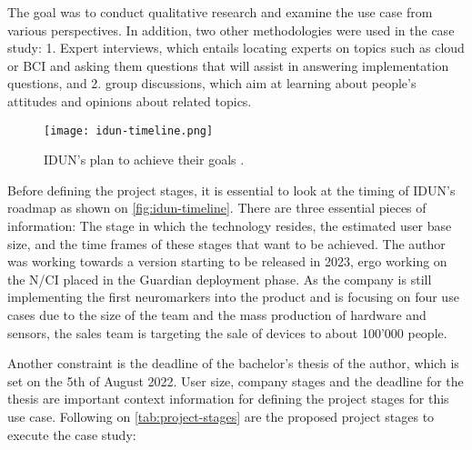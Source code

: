 The goal was to conduct qualitative research and examine the use case from various perspectives. In addition, two other methodologies were used in the case study: 1. Expert interviews, which entails locating experts on topics such as cloud or BCI and asking them questions that will assist in answering implementation questions, and 2. group discussions, which aim at learning about people's attitudes and opinions about related topics.

\begin{figure}[!ht]
  \centering
  \texttt{[image: idun-timeline.png]}
  \caption{IDUN's plan to achieve their goals \citep{idun_guardian_nodate}.}
  \label{fig:idun-timeline}
\end{figure}

Before defining the project stages, it is essential to look at the timing of IDUN's roadmap as shown on \autoref{fig:idun-timeline}. There are three essential pieces of information: The stage in which the technology resides, the estimated user base size, and the time frames of these stages that want to be achieved. The author was working towards a version starting to be released in 2023, ergo working on the N/CI placed in the Guardian deployment phase. As the company is still implementing the first neuromarkers into the product and is focusing on four use cases due to the size of the team and the mass production of hardware and sensors, the sales team is targeting the sale of devices to about 100'000 people.

Another constraint is the deadline of the bachelor's thesis of the author, which is set on the 5th of August 2022. User size, company stages and the deadline for the thesis are important context information for defining the project stages for this use case. Following on \autoref{tab:project-stages} are the proposed project stages to execute the case study:

